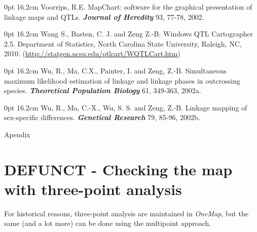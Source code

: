 \documentclass[letterpaper,12pt,oneside]{article}
\begin{document}
 0pt \linewidth 0.8cm 16.2cm
Voorrips, R.E. MapChart: software for the graphical presentation of linkage maps and QTLs. {\bf {\it Journal of Heredity}} 93, 77-78, 2002.


 0pt \linewidth 0.8cm 16.2cm
Wang S., Basten, C. J. and Zeng Z.-B. Windows QTL Cartographer 2.5. Department of Statistics, North Carolina State University, Raleigh, NC, 2010. (\url{http://statgen.ncsu.edu/qtlcart/WQTLCart.htm})

 0pt \linewidth 0.8cm 16.2cm
Wu, R., Ma, C.X., Painter, I. and Zeng, Z.-B. Simultaneous maximum likelihood estimation of linkage and linkage phases in outcrossing species. {\bf {\it Theoretical Population Biology}} 61, 349-363, 2002a.

 0pt \linewidth 0.8cm 16.2cm
Wu, R., Ma, C.-X., Wu, S. S. and Zeng, Z.-B. Linkage mapping of sex-specific differences. {\bf {\it Genetical Research}} 79, 85-96, 2002b.

\newpage

\begin{center}
  \Huge{Apendix}
\end{center}

\section{DEFUNCT - Checking the map with three-point analysis}
For historical reasons, three-point analysis are maintained in {\sl OneMap}, but the same (and a lot more) can be done using the multipoint approach.
\end{document}

